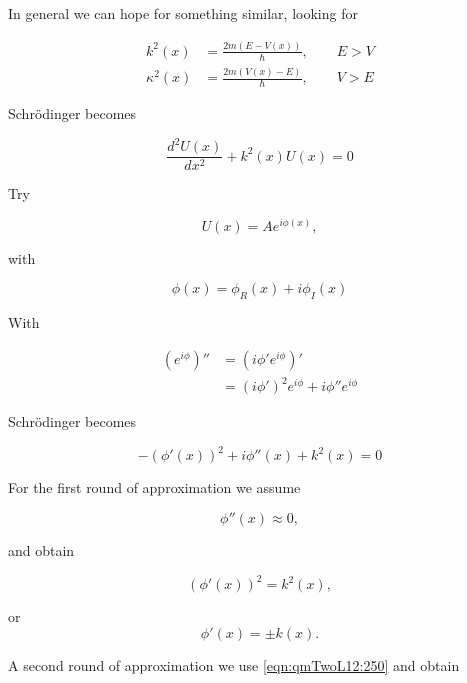 In general we can hope for something similar, looking for

\begin{align}\label{eqn:qmTwoL12:110}
k^2(x) &= \frac{2m (E - V(x))}{\hbar},\qquad E > V \\
\kappa^2(x) &= \frac{2m (V(x) - E)}{\hbar}, \qquad V > E
\end{align}

Schr\"{o}dinger becomes

\begin{equation}\label{eqn:qmTwoL12:130}
\frac{d^2 U(x)}{dx^2} + k^2(x) U(x) = 0
\end{equation}

Try

\begin{equation}\label{eqn:qmTwoL12:150}
U(x) = A e^{i \phi(x)},
\end{equation}

with 

\begin{equation}\label{eqn:qmTwoL12:170}
\phi(x) = \phi_R(x) + i \phi_I(x) 
\end{equation}

With 

\begin{align*}
(e^{i \phi})'' 
&=
(i \phi' e^{i \phi})'  \\
&=
(i \phi')^2 e^{i \phi} + i \phi'' e^{i \phi}
\end{align*}

Schr\"{o}dinger becomes

\begin{equation}\label{eqn:qmTwoL12:190}
- (\phi'(x))^2 + i \phi''(x) + k^2(x) = 0
\end{equation}

For the first round of approximation we assume

\begin{equation}\label{eqn:qmTwoL12:210}
\phi''(x) \approx 0,
\end{equation}

and obtain

\begin{equation}\label{eqn:qmTwoL12:230}
(\phi'(x))^2 = k^2(x),
\end{equation}

or
\begin{equation}\label{eqn:qmTwoL12:250}
\phi'(x) = \pm k(x).
\end{equation}

A second round of approximation we use \ref{eqn:qmTwoL12:250} and obtain


